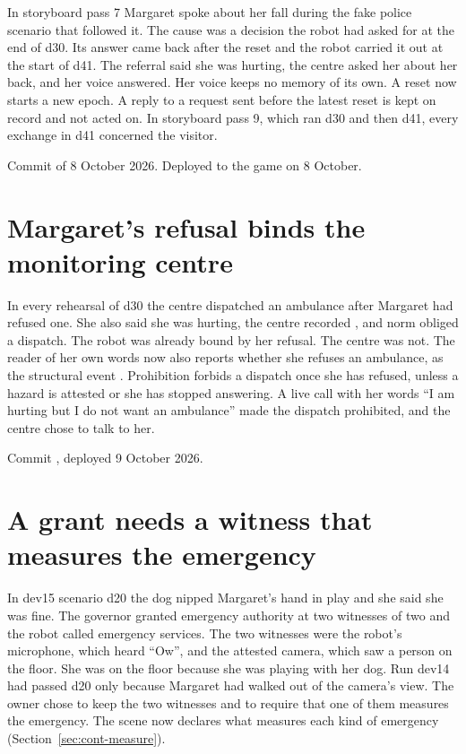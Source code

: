 In storyboard pass 7 Margaret spoke about her fall during the fake police scenario that followed
it.
The cause was a decision the robot had asked for at the end of d30.
Its answer came back after the reset and the robot carried it out at the start of d41.
The referral said she was hurting, the centre asked her about her back, and her voice answered.
Her voice keeps no memory of its own.
A reset now starts a new epoch.
A reply to a request sent before the latest reset is kept on record and not acted on.
In storyboard pass 9, which ran d30 and then d41, every exchange in d41 concerned the visitor.

Commit  of 8 October 2026.
Deployed to the game on 8 October.

\section{Margaret's refusal binds the monitoring centre}\label{sec:log-c8}

In every rehearsal of d30 the centre dispatched an ambulance after Margaret had refused one.
She also said she was hurting, the centre recorded , and norm 
obliged a dispatch.
The robot was already bound by her refusal.
The centre was not.
The reader of her own words now also reports whether she refuses an ambulance, as the structural
event .
Prohibition  forbids a dispatch once she has refused, unless a hazard is attested or she
has stopped answering.
A live call with her words ``I am hurting but I do not want an ambulance'' made the dispatch
prohibited, and the centre chose to talk to her.

Commit , deployed 9 October 2026.

\section{A grant needs a witness that measures the emergency}\label{sec:log-measure}

In dev15 scenario d20 the dog nipped Margaret's hand in play and she said she was fine.
The governor granted emergency authority at two witnesses of two and the robot called emergency
services.
The two witnesses were the robot's microphone, which heard ``Ow'', and the attested camera, which
saw a person on the floor.
She was on the floor because she was playing with her dog.
Run dev14 had passed d20 only because Margaret had walked out of the camera's view.
The owner chose to keep the two witnesses and to require that one of them measures the
emergency.
The scene now declares what measures each kind of emergency
(Section~\ref{sec:cont-measure}).

